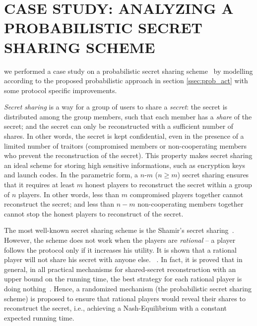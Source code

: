 \section{CASE STUDY: ANALYZING A PROBABILISTIC SECRET SHARING SCHEME}

we performed a case study on a probabilistic secret sharing scheme~\cite{HT04} by modelling according to the proposed probabilistic approach in section \ref{ssec:prob_act} with some protocol specific improvements.

\emph{Secret sharing} is a way for a group of users to share a \emph{secret}: the secret is distributed among the group members, such that each member has a \emph{share} of the secret; and the secret can only be reconstructed with a sufficient number of shares. In other words, the secret is kept confidential, even in the presence of a limited number of traitors (compromised members or non-cooperating members who prevent the reconstruction of the secret). This property makes secret sharing an ideal scheme for storing high sensitive informations, such as encryption keys and launch codes. In the parametric form, a $n\mbox{-}m$ ($n\geq m$) secret sharing ensures that it requires at least $m$ honest players to reconstruct the secret within a group of $n$ players. In other words, less than $m$ compromised players together cannot reconstruct the secret; and less than $n-m$ non-cooperating members together cannot stop the honest players to reconstruct of the secret.

The most well-known secret sharing scheme is the Shamir's secret sharing~\cite{Shamir79}. However, the scheme does not work when the players are \emph{rational} -- a player follows the protocol only if it increases his utility. It is shown that a rational player will not share his secret with anyone else. ~\cite{HT04}.  In fact, it is proved that in general, in all practical mechanisms for shared-secret reconstruction with an upper bound on the running time, the best strategy for each rational player is doing nothing~\cite{HT04}. Hence, a randomized mechanism (the probabilistic secret sharing scheme) is proposed to ensure that rational players would reveal their shares to reconstruct the secret, i.e., achieving a Nash-Equilibrium with a constant expected running time. 

